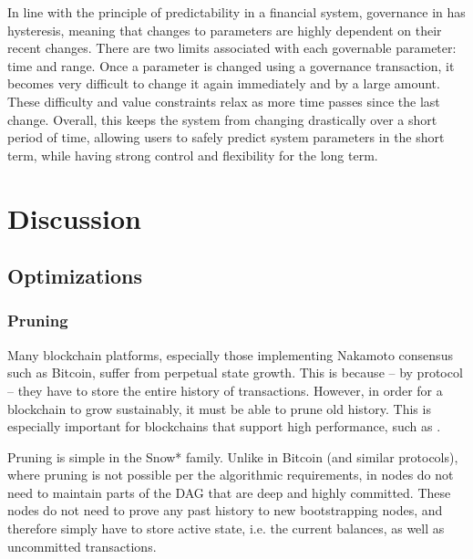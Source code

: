 \documentclass[runningheads]{llncs}
\begin{document}
In line with the principle of predictability in a financial system, governance in \AVATokenName{} has hysteresis, meaning that changes to parameters are highly dependent on their recent changes. There are two limits associated with each governable parameter: time and range. Once a parameter is changed using a governance transaction, it becomes very difficult to change it again immediately and by a large amount. These difficulty and value constraints relax as more time passes since the last change. 
Overall, this keeps the system from changing drastically over a short period of time, allowing users to safely predict system parameters in the short term, while having strong control and flexibility for the long term.


\section{Discussion}
\label{section:discussion}
\subsection{Optimizations}
\subsubsection{Pruning}
Many blockchain platforms, especially those implementing Nakamoto consensus such as Bitcoin, suffer from perpetual state growth. This is because -- by protocol -- they have to store the entire history of transactions. However, in order for a blockchain to grow sustainably, it must be able to prune old history. This is especially important for blockchains that support high performance, such as \AVAPlatformName{}. 

Pruning is simple in the Snow* family. Unlike in Bitcoin (and similar protocols), where pruning is not possible per the algorithmic requirements, in \AVATokenName{} nodes do not need to maintain parts of the DAG that are deep and highly committed. These nodes do not need to prove any past history to new bootstrapping nodes, and therefore simply have to store active state, i.e. the current balances, as well as uncommitted transactions. 
\end{document}
